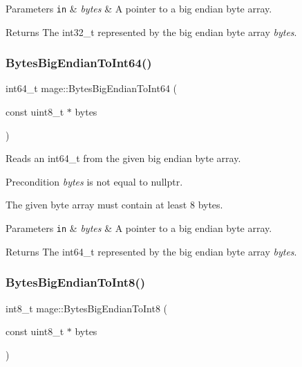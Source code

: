 \begin{DoxyParams}[1]{Parameters}
\mbox{\tt in}  & {\em bytes} & A pointer to a big endian byte array. \\
\hline
\end{DoxyParams}
\begin{DoxyReturn}{Returns}
The {\ttfamily int32\+\_\+t} represented by the big endian byte array {\itshape bytes}. 
\end{DoxyReturn}
\hypertarget{namespacemage_a52f6dec57a9c644e912a88f8cfabe199}{}\label{namespacemage_a52f6dec57a9c644e912a88f8cfabe199} 
\subsubsection{\texorpdfstring{Bytes\+Big\+Endian\+To\+Int64()}{BytesBigEndianToInt64()}}
{\footnotesize\ttfamily int64\+\_\+t mage\+::\+Bytes\+Big\+Endian\+To\+Int64 (\begin{DoxyParamCaption}\item[{const uint8\+\_\+t $\ast$}]{bytes }\end{DoxyParamCaption})}

Reads an int64\+\_\+t from the given big endian byte array.

\begin{DoxyPrecond}{Precondition}
{\itshape bytes} is not equal to {\ttfamily nullptr}. 

The given byte array must contain at least 8 bytes. 
\end{DoxyPrecond}

\begin{DoxyParams}[1]{Parameters}
\mbox{\tt in}  & {\em bytes} & A pointer to a big endian byte array. \\
\hline
\end{DoxyParams}
\begin{DoxyReturn}{Returns}
The {\ttfamily int64\+\_\+t} represented by the big endian byte array {\itshape bytes}. 
\end{DoxyReturn}
\hypertarget{namespacemage_a7dd5ebfc406cb1d6a8a403a8db29af36}{}\label{namespacemage_a7dd5ebfc406cb1d6a8a403a8db29af36} 
\subsubsection{\texorpdfstring{Bytes\+Big\+Endian\+To\+Int8()}{BytesBigEndianToInt8()}}
{\footnotesize\ttfamily int8\+\_\+t mage\+::\+Bytes\+Big\+Endian\+To\+Int8 (\begin{DoxyParamCaption}\item[{const uint8\+\_\+t $\ast$}]{bytes }\end{DoxyParamCaption})}

